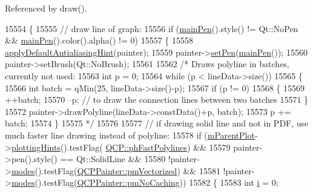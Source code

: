 Referenced by draw().


\begin{DoxyCode}
15554 \{
15555   \textcolor{comment}{// draw line of graph:}
15556   \textcolor{keywordflow}{if} (\hyperlink{class_q_c_p_abstract_plottable_a19276ed2382a3a06464417b8788b1451}{mainPen}().style() != Qt::NoPen && \hyperlink{class_q_c_p_abstract_plottable_a19276ed2382a3a06464417b8788b1451}{mainPen}().color().alpha() != 0)
15557   \{
15558     \hyperlink{class_q_c_p_abstract_plottable_a76e9d6cc7972dc1528f526d163766aca}{applyDefaultAntialiasingHint}(painter);
15559     painter->\hyperlink{class_q_c_p_painter_af9c7a4cd1791403901f8c5b82a150195}{setPen}(\hyperlink{class_q_c_p_abstract_plottable_a19276ed2382a3a06464417b8788b1451}{mainPen}());
15560     painter->setBrush(Qt::NoBrush);
15561     
15562     \textcolor{comment}{/* Draws polyline in batches, currently not used:}
15563 \textcolor{comment}{    int p = 0;}
15564 \textcolor{comment}{    while (p < lineData->size())}
15565 \textcolor{comment}{    \{}
15566 \textcolor{comment}{      int batch = qMin(25, lineData->size()-p);}
15567 \textcolor{comment}{      if (p != 0)}
15568 \textcolor{comment}{      \{}
15569 \textcolor{comment}{        ++batch;}
15570 \textcolor{comment}{        --p; // to draw the connection lines between two batches}
15571 \textcolor{comment}{      \}}
15572 \textcolor{comment}{      painter->drawPolyline(lineData->constData()+p, batch);}
15573 \textcolor{comment}{      p += batch;}
15574 \textcolor{comment}{    \}}
15575 \textcolor{comment}{    */}
15576     
15577     \textcolor{comment}{// if drawing solid line and not in PDF, use much faster line drawing instead of polyline:}
15578     \textcolor{keywordflow}{if} (\hyperlink{class_q_c_p_layerable_aa2a528433e44db02b8aef23c1f9f90ed}{mParentPlot}->\hyperlink{class_q_custom_plot_a130b55e205697a5288081e9fc11e443e}{plottingHints}().testFlag(
      \hyperlink{namespace_q_c_p_a5400e5fcb9528d92002ddb938c1f4ef4aa5fd227bc878c56ad2a87ea32c74ee4d}{QCP::phFastPolylines}) &&
15579         painter->pen().style() == Qt::SolidLine &&
15580         !painter->\hyperlink{class_q_c_p_painter_a99b89eaf5363faaa1e1e6162856f436c}{modes}().testFlag(\hyperlink{class_q_c_p_painter_a156cf16444ff5e0d81a73c615fdb156daeda679cd55dcd468341d07d48a30b6ab}{QCPPainter::pmVectorized}) &&
15581         !painter->\hyperlink{class_q_c_p_painter_a99b89eaf5363faaa1e1e6162856f436c}{modes}().testFlag(\hyperlink{class_q_c_p_painter_a156cf16444ff5e0d81a73c615fdb156dae78f9a4eb277a5f9207f50850a51a0b0}{QCPPainter::pmNoCaching}))
15582     \{
15583       \textcolor{keywordtype}{int} \hyperlink{_comparision_pictures_2_createtest_image_8m_a6f6ccfcf58b31cb6412107d9d5281426}{i} = 0;

\end{DoxyCode}
